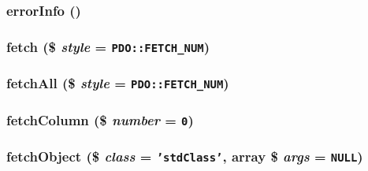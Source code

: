 \hypertarget{class_cahnory_d_b___access_c5230ce6cd46c5e922146a441d807877}{
\subsubsection[{errorInfo}]{\setlength{\rightskip}{0pt plus 5cm}errorInfo ()}}
\label{class_cahnory_d_b___access_c5230ce6cd46c5e922146a441d807877}


\hypertarget{class_cahnory_d_b___access_61869dad7eba08b537578ad93c33d54b}{
\subsubsection[{fetch}]{\setlength{\rightskip}{0pt plus 5cm}fetch (\$ {\em style} = {\tt PDO::FETCH\_\-NUM})}}
\label{class_cahnory_d_b___access_61869dad7eba08b537578ad93c33d54b}


\hypertarget{class_cahnory_d_b___access_6b3091c2c795a88b8f41c53ea4ad63d8}{
\subsubsection[{fetchAll}]{\setlength{\rightskip}{0pt plus 5cm}fetchAll (\$ {\em style} = {\tt PDO::FETCH\_\-NUM})}}
\label{class_cahnory_d_b___access_6b3091c2c795a88b8f41c53ea4ad63d8}


\hypertarget{class_cahnory_d_b___access_4094fc1094eb7d4dc260cd0d60dbf0bd}{
\subsubsection[{fetchColumn}]{\setlength{\rightskip}{0pt plus 5cm}fetchColumn (\$ {\em number} = {\tt 0})}}
\label{class_cahnory_d_b___access_4094fc1094eb7d4dc260cd0d60dbf0bd}


\hypertarget{class_cahnory_d_b___access_d12d0a7f82d9a44c94574703b7abdf65}{
\subsubsection[{fetchObject}]{\setlength{\rightskip}{0pt plus 5cm}fetchObject (\$ {\em class} = {\tt 'stdClass'}, \/  array \$ {\em args} = {\tt NULL})}}
\label{class_cahnory_d_b___access_d12d0a7f82d9a44c94574703b7abdf65}



